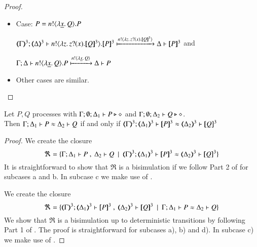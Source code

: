 \begin{proof}
\begin{enumerate}
\begin{itemize}
		\item	Case: $P = n ! \langle \lambda \underline{x}.\,Q \rangle . P$

			$\horel{\tmap{\Gamma}{3}}{\tmap{\Delta}{3}}{\bout{n}{\abs{z} \binp{z}{x} \pmap{Q}{3}} \pmap{P}{3}}{\hby{ \bactout{n}{\abs{z}{\binp{z}{x} \pmap{Q}{3}} } }}{\Delta}{\pmap{P}{3}}$ and

			$\Gamma; \Delta \vdash n ! \langle \lambda \underline{x}.\,Q \rangle . P \xmapsto{ n !\langle \lambda \underline{x}.\,Q \rangle} \Delta \vdash P$
		\item Other cases are similar. 
	\end{itemize}
\end{enumerate}
\end{proof}

\begin{proposition}\myrm
	\label{app:prop:fulla_HOpp_to_HOp}
	Let $P, Q$ \HOpp processes with $\Gamma; \emptyset; \Delta_1 \vdash P \triangleright \diamond$ and 
	$\Gamma; \emptyset; \Delta_2 \vdash Q \triangleright \diamond$. \\
	Then 
	$\Gamma; \Delta_1 \vdash P \approx \Delta_2 \vdash Q$ if and only if $\horel{\tmap{\Gamma}{3}}{\tmap{\Delta_1}{3}}{\pmap{P}{3}}{\wb}{\tmap{\Delta_2}{3}}{\pmap{Q}{3}}$
\end{proposition}

\begin{proof}

	\noi We create the closure
%
	\[
		\Re = \set{\horel{\Gamma}{\Delta_1}{P}{\ ,\ }{\Delta_2}{Q} \setbar \horel{\tmap{\Gamma}{3}}{\tmap{\Delta_1}{3}}{\pmap{P}{3}}{\wb}{\tmap{\Delta_2}{3}}{\pmap{Q}{3}}}
	\]
%
	\noi	It is straightforward to show that $\Re$ is a bisimulation if we follow Part 2 of
		 for subcases a and b.
		In subcase c we make use of .


	\noi We create the closure
%
	\[
		\Re = \set{\horel{\tmap{\Gamma}{3}}{\tmap{\Delta_1}{3}}{\pmap{P}{3}}{\ ,\ }{\tmap{\Delta_2}{3}}{\pmap{Q}{3}} \setbar \horel{\Gamma}{\Delta_1}{P}{\wb}{\Delta_2}{Q}}
	\]
%
	\noi	We show that $\Re$ is a bisimulation up to deterministic transitions
		by following Part 1 of .
		The proof is straightforward for subcases a), b) and d).
		In subcase c) we make use of .
\end{proof}



